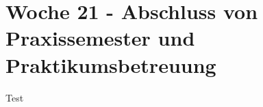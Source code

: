 \section{Woche 21 - Abschluss von Praxissemester und Praktikumsbetreuung} \label{sec:bericht-wo-21}



Test
